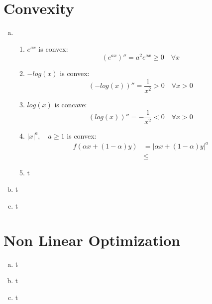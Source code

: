 \documentclass{article}
\begin{document}
\section{Convexity}
\begin{enumerate}[(a)] 
\item \begin{enumerate}[label=\roman*.]
\item $e^{ax}$ is convex:
\[(e^{ax})'' = a^2e^{ax} \ge 0 \quad \forall x\]
\item $-log(x)$ is convex:
\[(-log(x))'' = \frac{1}{x^2} > 0 \quad \forall x > 0\]
\item $log(x)$ is concave:
\[(log(x))'' = -\frac{1}{x^2} < 0 \quad \forall x > 0\]
\item $|x|^a, \quad a \ge 1$ is convex:
\begin{align*}
f(\alpha x+(1-\alpha)y) &= |\alpha x+(1-\alpha)y|^a\\
&\le 
\end{align*}
\item t
\end{enumerate}
\item t
\item t
\end{enumerate}
\section{Non Linear Optimization}
\begin{enumerate}[(a)] 
\item t
\item t
\item t
\end{enumerate}
\end{document}
